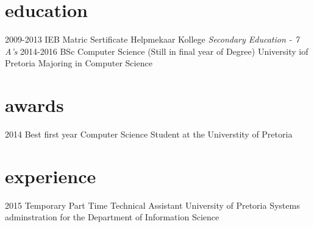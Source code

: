 \documentclass[]{twentysecondcv}
\begin{document}
\section{education}

\begin{twenty}
  \twentyitem
    {2009-2013}
    {IEB Matric Sertificate}
    {Helpmekaar Kollege}
    {\emph{Secondary Education - 7 A's}}
  \twentyitem
    {2014-2016}
    {BSc Computer Science (Still in final year of Degree)}
    {University iof Pretoria}
    {Majoring in Computer Science}
\end{twenty}


\section{awards}

\begin{twentyshort}
  \twentyitemshort
    {2014}
    {Best first year Computer Science Student at the Universtity of Pretoria}
\end{twentyshort}


\section{experience}

\begin{twenty}
  \twentyitem
    {2015}
    {Temporary Part Time Technical Assistant}
    {University of Pretoria}
    {Systems adminstration for the Department of Information Science}
\end{twenty}

\end{document}
